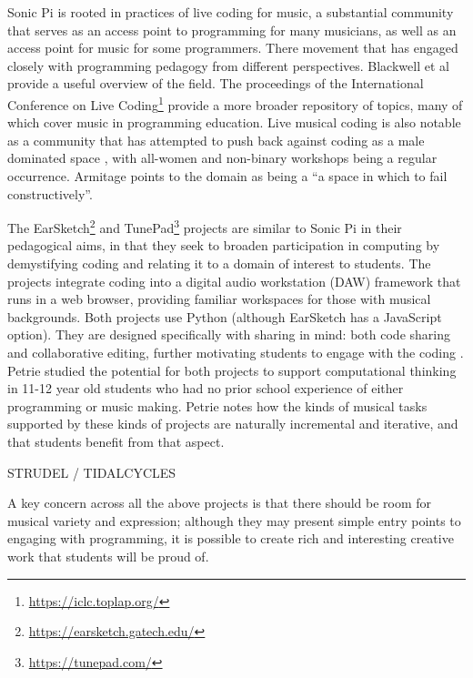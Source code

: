 Sonic Pi is rooted in practices of live coding for music, a substantial community that serves as an access point to programming for many musicians, as well as an access point for music for some programmers. There  movement that has engaged closely with programming pedagogy from different perspectives. Blackwell et al \cite{blackwell_livecoding_2022} provide a useful overview of the field. The proceedings of the International Conference on Live Coding\footnote{\url{https://iclc.toplap.org/}} provide a more broader repository of topics, many of which cover music in programming education. Live musical coding is also notable as a community that has attempted to push back against coding as a male dominated space \cite{blackwell_livecoding_2022}, with all-women and non-binary workshops being a regular occurrence. Armitage \cite{armitage_spaces_2018} points to the domain as being a ``a space in which to fail constructively''.

The EarSketch\footnote{\url{https://earsketch.gatech.edu/}} \cite{engelman_earsketch_2017} and TunePad\footnote{\url{https://tunepad.com/}} projects are similar to Sonic Pi in their pedagogical aims, in that they seek to broaden participation in computing by demystifying coding and relating it to a domain of interest to students. The projects integrate coding into a digital audio workstation (DAW) framework that runs in a web browser, providing familiar workspaces for those with musical backgrounds. Both projects use Python (although EarSketch has a JavaScript option). They are designed specifically with sharing in mind: both code sharing and collaborative editing, further motivating students to engage with the coding \cite{freeman_earsketch_2019}. Petrie \cite{petrie_ct_2024} studied the potential for both projects to support computational thinking in 11-12 year old students who had no prior school experience of either programming or music making. Petrie notes how the kinds of musical tasks supported by these kinds of projects are naturally incremental and iterative, and that students benefit from that aspect.

STRUDEL / TIDALCYCLES


A key concern across all the above projects is that there should be room for musical variety and expression; although they may present simple entry points to engaging with programming, it is possible to create rich and interesting creative work that students will be proud of.


